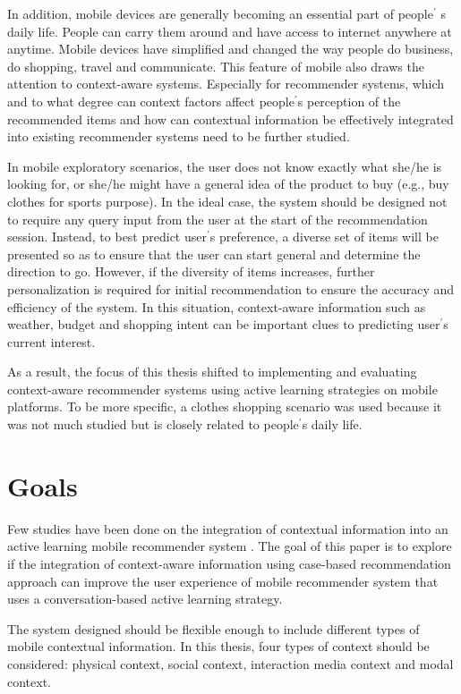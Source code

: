 In addition, mobile devices are generally becoming an essential part of people$^\prime$ s daily life. People can carry them around and have access to internet anywhere at anytime. Mobile devices have simplified and changed the way people do business, do shopping, travel and communicate. This feature of mobile also draws the attention to context-aware systems. Especially for recommender systems, which and to what degree can context factors affect people$^\prime$s perception of the recommended items and how can contextual information be effectively integrated into existing recommender systems need to be further studied. 

In mobile exploratory scenarios, the user does not know exactly what she/he is looking for, or she/he might have a general idea of the product to buy (e.g., buy clothes for sports purpose). In the ideal case, the system should be designed not to require any query input from the user at the start of the recommendation session. Instead, to best predict user$^\prime$s preference, a diverse set of items will be presented so as to ensure that the user can start general and determine the direction to go. However, if the diversity of items increases, further personalization is required for initial recommendation to ensure the accuracy and efficiency of the system. In this situation, context-aware information such as weather, budget and shopping intent can be important clues to predicting user$^\prime$s current interest. 

As a result, the focus of this thesis shifted to implementing and evaluating context-aware recommender systems using active learning strategies on mobile platforms. To be more specific, a clothes shopping scenario was used because it was not much studied but is closely related to people$^\prime$s daily life.

\section{Goals} \label{sec:gl}

Few studies have been done on the integration of contextual information into an active learning mobile recommender system \cite{ref:5, ref:12, ref:26}. The goal of this paper is to explore if the integration of context-aware information using case-based recommendation approach can improve the user experience of mobile recommender system that uses a conversation-based active learning strategy.

The system designed should be flexible enough to include different types of mobile contextual information. In this thesis, four types of context should be considered: physical context, social context, interaction media context and modal context.

